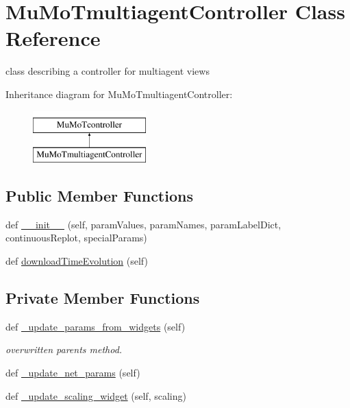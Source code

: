 \hypertarget{class_mu_mo_t_1_1_mu_mo_tmultiagent_controller}{}\section{Mu\+Mo\+Tmultiagent\+Controller Class Reference}
\label{class_mu_mo_t_1_1_mu_mo_tmultiagent_controller}


class describing a controller for multiagent views  


Inheritance diagram for Mu\+Mo\+Tmultiagent\+Controller\+:\begin{figure}[H]
\begin{center}
\leavevmode
\includegraphics[height=2.000000cm]{class_mu_mo_t_1_1_mu_mo_tmultiagent_controller}
\end{center}
\end{figure}
\subsection*{Public Member Functions}
\begin{DoxyCompactItemize}
\item 
def \hyperlink{class_mu_mo_t_1_1_mu_mo_tmultiagent_controller_a203e76c007a565312c5715712851aadb}{\+\_\+\+\_\+init\+\_\+\+\_\+} (self, param\+Values, param\+Names, param\+Label\+Dict, continuous\+Replot, special\+Params)
\item 
def \hyperlink{class_mu_mo_t_1_1_mu_mo_tmultiagent_controller_afa43c0f74ab5a6630a4b7ab0af8ed990}{download\+Time\+Evolution} (self)
\end{DoxyCompactItemize}
\subsection*{Private Member Functions}
\begin{DoxyCompactItemize}
\item 
def \hyperlink{class_mu_mo_t_1_1_mu_mo_tmultiagent_controller_add4eacb8e812feeca1d4b2538e3bd6e0}{\+\_\+update\+\_\+params\+\_\+from\+\_\+widgets} (self)
\begin{DoxyCompactList}\small\item\em overwritten parent\textquotesingle{}s method. \end{DoxyCompactList}\item 
def \hyperlink{class_mu_mo_t_1_1_mu_mo_tmultiagent_controller_a05f01fc433f3ff6861ec56d6663cb84e}{\+\_\+update\+\_\+net\+\_\+params} (self)
\item 
def \hyperlink{class_mu_mo_t_1_1_mu_mo_tmultiagent_controller_a66b8497b0cb4b6a35c08c72da6ade6c3}{\+\_\+update\+\_\+scaling\+\_\+widget} (self, scaling)
\end{DoxyCompactItemize}
